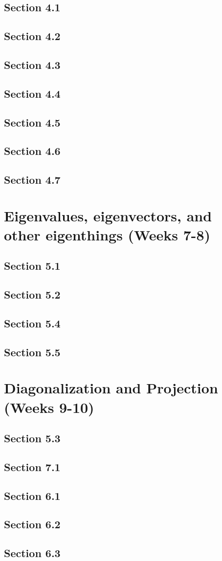 \documentclass{amsart}
\begin{document}
\subsection*{Section 4.1}
\subsection*{Section 4.2}
\subsection*{Section 4.3}
\subsection*{Section 4.4}
\subsection*{Section 4.5}
\subsection*{Section 4.6}
\subsection*{Section 4.7}


\section{Eigenvalues, eigenvectors, and other eigenthings (Weeks 7-8)}

\subsection*{Section 5.1}
\subsection*{Section 5.2}
\subsection*{Section 5.4}
\subsection*{Section 5.5}


\section{Diagonalization and Projection (Weeks 9-10)}

\subsection*{Section 5.3}
\subsection*{Section 7.1}
\subsection*{Section 6.1}
\subsection*{Section 6.2}
\subsection*{Section 6.3}
\end{document}

